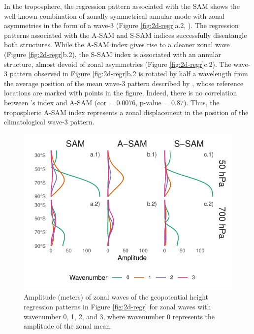 \documentclass[smallextended]{svjour3}       %
\begin{document}
In the troposphere, the regression pattern associated with the SAM shows the well-known combination of zonally symmetrical annular mode with zonal asymmetries in the form of a wave-3 (Figure \ref{fig:2d-regr}a.2, \citep{fogt2012}). The regression patterns associated with the A\nobreakdash-SAM and S\nobreakdash-SAM indices successfully disentangle both structures. While the A\nobreakdash-SAM index gives rise to a cleaner zonal wave (Figure \ref{fig:2d-regr}b.2), the S\nobreakdash-SAM index is associated with an annular structure, almost devoid of zonal asymmetries (Figure \ref{fig:2d-regr}c.2). The wave-3 pattern observed in Figure \ref{fig:2d-regr}b.2 is rotated by half a wavelength from the average position of the mean wave-3 pattern described by \citet{raphael2004}, whose reference locations are marked with points in the figure. Indeed, there is no correlation between \citet{raphael2004}'s index and A\nobreakdash-SAM (cor = 0.0076, p-value = 0.87). Thus, the tropospheric A\nobreakdash-SAM index represents a zonal displacement in the position of the climatological wave-3 pattern.



\begin{figure}
\includegraphics{wave-amplitude-1} \caption{Amplitude (meters) of zonal waves of the geopotential height regression patterns in Figure \ref{fig:2d-regr} for zonal waves with wavenumber 0, 1, 2, and 3, where wavenumber 0 represents the amplitude of the zonal mean.}\label{fig:wave-amplitude}
\end{figure}
\end{document}
